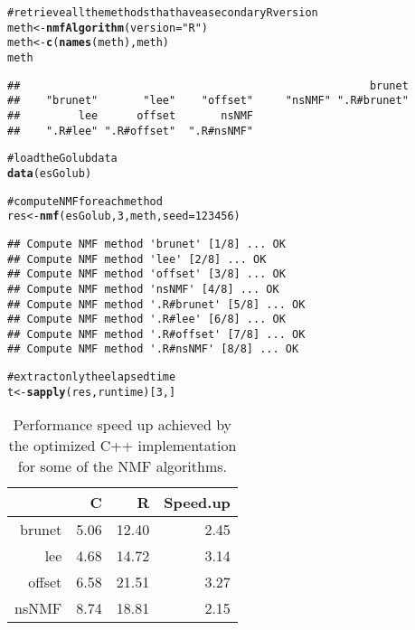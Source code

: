 \documentclass[a4paper]{article}\usepackage{graphicx, color}
\makeatletter
\newcommand{\hlfunctioncall}[1]{\textcolor[rgb]{0.501960784313725,0,0.329411764705882}{\textbf{#1}}}%
\newcommand{\hlstring}[1]{\textcolor[rgb]{0.6,0.6,1}{#1}}%
\newcommand{\hlcomment}[1]{\textcolor[rgb]{0.180392156862745,0.6,0.341176470588235}{#1}}%
\newenvironment{kframe}{%
 \def\at@end@of@kframe{}%
 \ifinner\ifhmode%
  \def\at@end@of@kframe{\end{minipage}}%
  \begin{minipage}{\columnwidth}%
 \fi\fi%
 \def\FrameCommand##1{\hskip\@totalleftmargin \hskip-\fboxsep
 \colorbox{shadecolor}{##1}\hskip-\fboxsep
     \hskip-\linewidth \hskip-\@totalleftmargin \hskip\columnwidth}%
 \MakeFramed {\advance\hsize-\width
   \@totalleftmargin\z@ \linewidth\hsize
   \@setminipage}}%
 {\par\unskip\endMakeFramed%
 \at@end@of@kframe}
\newenvironment{knitrout}{}{} %
\makeatother
\begin{document}
\begin{knitrout}
\color{fgcolor}\begin{kframe}
\begin{alltt}
\hlcomment{# retrieve all the methods that have a secondary R version}
meth <- \hlfunctioncall{nmfAlgorithm}(version = \hlstring{"R"})
meth <- \hlfunctioncall{c}(\hlfunctioncall{names}(meth), meth)
meth
\end{alltt}
\begin{verbatim}
##                                                      brunet 
##    "brunet"       "lee"    "offset"     "nsNMF" ".R#brunet" 
##         lee      offset       nsNMF 
##    ".R#lee" ".R#offset"  ".R#nsNMF"
\end{verbatim}
\begin{alltt}

\hlcomment{# load the Golub data}
\hlfunctioncall{data}(esGolub)

\hlcomment{# compute NMF for each method}
res <- \hlfunctioncall{nmf}(esGolub, 3, meth, seed = 123456)
\end{alltt}
\begin{verbatim}
## Compute NMF method 'brunet' [1/8] ... OK
## Compute NMF method 'lee' [2/8] ... OK
## Compute NMF method 'offset' [3/8] ... OK
## Compute NMF method 'nsNMF' [4/8] ... OK
## Compute NMF method '.R#brunet' [5/8] ... OK
## Compute NMF method '.R#lee' [6/8] ... OK
## Compute NMF method '.R#offset' [7/8] ... OK
## Compute NMF method '.R#nsNMF' [8/8] ... OK
\end{verbatim}
\begin{alltt}

\hlcomment{# extract only the elapsed time}
t <- \hlfunctioncall{sapply}(res, runtime)[3, ]
\end{alltt}
\end{kframe}
\end{knitrout}



\begin{table}[ht]
\begin{center}
\begin{tabular}{rrrr}
  \hline
 & C & R & Speed.up \\ 
  \hline
brunet & 5.06 & 12.40 & 2.45 \\ 
  lee & 4.68 & 14.72 & 3.14 \\ 
  offset & 6.58 & 21.51 & 3.27 \\ 
  nsNMF & 8.74 & 18.81 & 2.15 \\ 
   \hline
\end{tabular}
\caption{Performance speed up achieved by the optimized C++ implementation for some of the NMF algorithms.}
\label{tab:perf}
\end{center}
\end{table}
\end{document}

